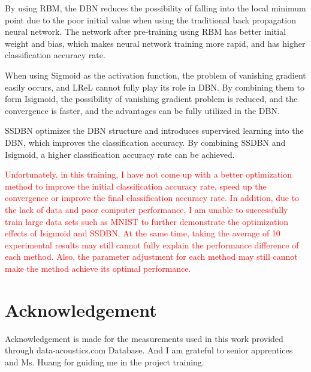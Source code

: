 \documentclass{modified}
\begin{document}
By using RBM, the DBN reduces the possibility of falling into the local minimum point due to the poor initial value when using the traditional back propagation neural network. The network after pre-training using RBM has better initial weight and bias, which makes neural network training more rapid, and has higher classification accuracy rate.

When using Sigmoid as the activation function, the problem of vanishing gradient easily occurs, and LReL cannot fully play its role in DBN. By combining them to form Isigmoid, the possibility of vanishing gradient problem is reduced, and the convergence is faster, and the advantages can be fully utilized in the DBN.

SSDBN optimizes the DBN structure and introduces supervised learning into the DBN, which improves the classification accuracy. By combining SSDBN and Isigmoid, a higher classification accuracy rate can be achieved.

\textcolor{red}{Unfortunately, in this training, I have not come up with a better optimization method to improve the initial classification accuracy rate, speed up the convergence or improve the final classification accuracy rate. In addition, due to the lack of data and poor computer performance, I am unable to successfully train large data sets such as MNIST to further demonstrate the optimization effects of Isigmoid and SSDBN. At the same time, taking the average of 10 experimental results may still cannot fully explain the performance difference of each method. Also, the parameter adjustment for each method may still cannot make the method achieve its optimal performance.}


\section*{Acknowledgement}
Acknowledgement is made for the measurements used in this work provided through data-acoustics.com Database. And I am grateful to senior apprentices and Ms. Huang for guiding me in the project training.




 
\end{document}
